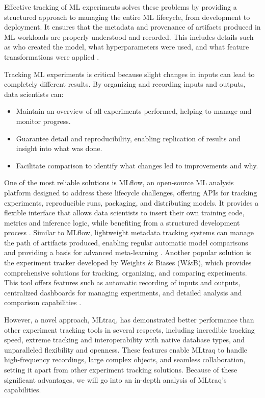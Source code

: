 Effective tracking of ML experiments solves these problems by providing a structured approach to managing the entire ML lifecycle, from development to deployment. It ensures that the metadata and provenance of artifacts produced in ML workloads are properly understood and recorded. This includes details such as who created the model, what hyperparameters were used, and what feature transformations were applied \cite{schelter2017automatically}.

Tracking ML experiments is critical because slight changes in inputs can lead to completely different results. By organizing and recording inputs and outputs, data scientists can:

\begin{itemize}
    \item Maintain an overview of all experiments performed, helping to manage and monitor progress.
    \item Guarantee detail and reproducibility, enabling replication of results and insight into what was done.
    \item Facilitate comparison to identify what changes led to improvements and why.
\end{itemize}

One of the most reliable solutions is MLflow, an open-source ML analysis platform designed to address these lifecycle challenges, offering APIs for tracking experiments, reproducible runs, packaging, and distributing models. It provides a flexible interface that allows data scientists to insert their own training code, metrics and inference logic, while benefiting from a structured development process \cite{zaharia2018accelerating}. Similar to MLflow, lightweight metadata tracking systems can manage the path of artifacts produced, enabling regular automatic model comparisons and providing a basis for advanced meta-learning \cite{schelter2017automatically}. Another popular solution is the experiment tracker developed by Weights \& Biases (W\&B), which provides comprehensive solutions for tracking, organizing, and comparing experiments. This tool offers features such as automatic recording of inputs and outputs, centralized dashboards for managing experiments, and detailed analysis and comparison capabilities \cite{wandb2023}.

However, a novel approach, MLtraq, has demonstrated better performance than other experiment tracking tools in several respects, including incredible tracking speed, extreme tracking and interoperability with native database types, and unparalleled flexibility and openness. These features enable MLtraq to handle high-frequency recordings, large complex objects, and seamless collaboration, setting it apart from other experiment tracking solutions. Because of these significant advantages, we will go into an in-depth analysis of MLtraq's capabilities.

